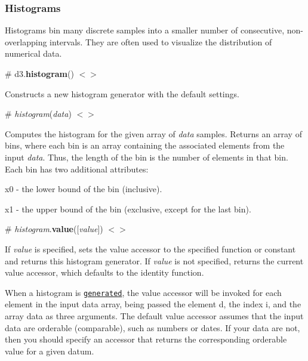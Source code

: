 \subsubsection*{Histograms}

\href{http://bl.ocks.org/mbostock/3048450}{\tt }

Histograms bin many discrete samples into a smaller number of consecutive, non-\/overlapping intervals. They are often used to visualize the distribution of numerical data.

\label{_histogram}%
\# d3.{\bfseries histogram}() \href{https://github.com/d3/d3-array/blob/master/src/histogram.js}{\tt $<$$>$}

Constructs a new histogram generator with the default settings.

\label{__histogram}%
\# {\itshape histogram}({\itshape data}) \href{https://github.com/d3/d3-array/blob/master/src/histogram.js#L14}{\tt $<$$>$}

Computes the histogram for the given array of {\itshape data} samples. Returns an array of bins, where each bin is an array containing the associated elements from the input {\itshape data}. Thus, the {\ttfamily length} of the bin is the number of elements in that bin. Each bin has two additional attributes\+:


\begin{DoxyItemize}
\item {\ttfamily x0} -\/ the lower bound of the bin (inclusive).
\item {\ttfamily x1} -\/ the upper bound of the bin (exclusive, except for the last bin).
\end{DoxyItemize}

\label{_histogram_value}%
\# {\itshape histogram}.{\bfseries value}(\mbox{[}{\itshape value}\mbox{]}) \href{https://github.com/d3/d3-array/blob/master/src/histogram.js#L58}{\tt $<$$>$}

If {\itshape value} is specified, sets the value accessor to the specified function or constant and returns this histogram generator. If {\itshape value} is not specified, returns the current value accessor, which defaults to the identity function.

When a histogram is \href{#_histogram}{\tt generated}, the value accessor will be invoked for each element in the input data array, being passed the element {\ttfamily d}, the index {\ttfamily i}, and the array {\ttfamily data} as three arguments. The default value accessor assumes that the input data are orderable (comparable), such as numbers or dates. If your data are not, then you should specify an accessor that returns the corresponding orderable value for a given datum.

